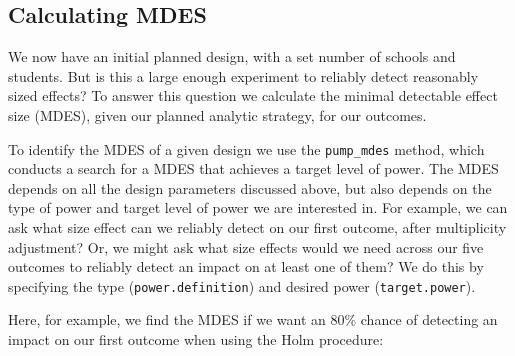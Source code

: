 \documentclass[
]{article}
\begin{document}
\subsection{Calculating MDES}

We now have an initial planned design, with a set number of schools and
students. But is this a large enough experiment to reliably detect
reasonably sized effects? To answer this question we calculate the
minimal detectable effect size (MDES), given our planned analytic
strategy, for our outcomes.

To identify the MDES of a given design we use the \texttt{pump\_mdes}
method, which conducts a search for a MDES that achieves a target level
of power. The MDES depends on all the design parameters discussed above,
but also depends on the type of power and target level of power we are
interested in. For example, we can ask what size effect can we reliably
detect on our first outcome, after multiplicity adjustment? Or, we might
ask what size effects would we need across our five outcomes to reliably
detect an impact on at least one of them? We do this by specifying the
type (\texttt{power.definition}) and desired power
(\texttt{target.power}).

Here, for example, we find the MDES if we want an 80\% chance of
detecting an impact on our first outcome when using the Holm procedure:
\end{document}
